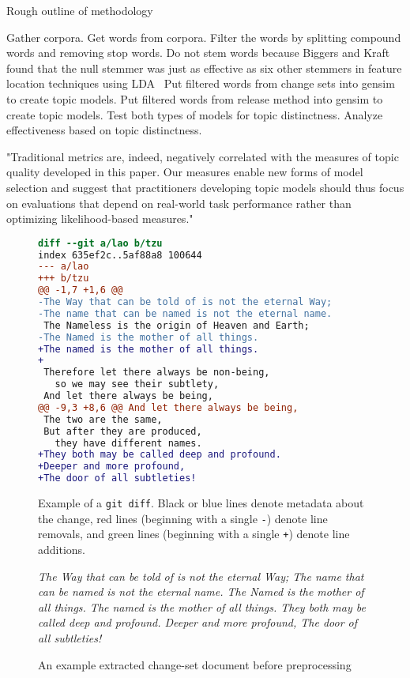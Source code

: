 
Rough outline of methodology

Gather corpora.
Get words from corpora.
Filter the words by splitting compound words and removing stop words.
Do not stem words because Biggers and Kraft found that the null stemmer was just as effective as six other stemmers in feature location techniques using LDA~\cite{Biggers-Kraft:2012}
Put filtered words from change sets into gensim to create topic models.
Put filtered words from release method into gensim to create topic models.
Test both types of models for topic distinctness.
Analyze effectiveness based on topic distinctness.


"Traditional metrics are, indeed, negatively correlated with the
measures of topic quality developed in this paper.  Our measures enable
new forms of model selection and suggest that practitioners developing
topic models should thus focus on evaluations that depend on real-world
task performance rather than optimizing likelihood-based measures." ~\cite{Chang-etal:2009}

\begin{figure}[ht]
\centering
\footnotesize
\begin{lstlisting}[language=diff, basicstyle=\ttfamily]
diff --git a/lao b/tzu
index 635ef2c..5af88a8 100644
--- a/lao
+++ b/tzu
@@ -1,7 +1,6 @@
-The Way that can be told of is not the eternal Way;
-The name that can be named is not the eternal name.
 The Nameless is the origin of Heaven and Earth;
-The Named is the mother of all things.
+The named is the mother of all things.
+
 Therefore let there always be non-being,
   so we may see their subtlety,
 And let there always be being,
@@ -9,3 +8,6 @@ And let there always be being,
 The two are the same,
 But after they are produced,
   they have different names.
+They both may be called deep and profound.
+Deeper and more profound,
+The door of all subtleties!
\end{lstlisting}
\caption{Example of a \texttt{git diff}. Black or blue lines denote metadata about the change, red lines (beginning with a single \texttt{-}) denote line removals, and green lines (beginning with a single \texttt{+}) denote line additions.}
\label{fig:diff}
\end{figure}

\begin{figure}[ht]
\em
\footnotesize
The Way that can be told of is not the eternal Way;
The name that can be named is not the eternal name.
The Named is the mother of all things.
The named is the mother of all things.
They both may be called deep and profound.
Deeper and more profound,
The door of all subtleties!
\caption{An example extracted change-set document before preprocessing}
\label{fig:diffdocument}
\end{figure}

